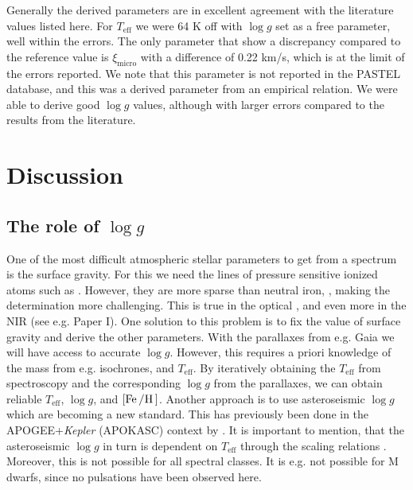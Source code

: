 \documentclass[a4paper,fleqn,usenatbib]{mnras}
\begin{document}
Generally the derived parameters are in excellent agreement with the literature
values listed here.  For $T_\mathrm{eff}$ we were 64 K off with $\log
g$ set as a free parameter, well within the errors. The only parameter that show
a discrepancy compared to the reference value is $\xi_\mathrm{micro}$ with a
difference of 0.22 km/s, which is at the limit of the errors reported. We
note that this parameter is not reported in the PASTEL database, and this was a
derived parameter from an empirical relation. We were able to derive good $\log
g$ values, although with larger errors compared to the results from the
literature.



\section{Discussion}
\label{sec:discussion}

\subsection{The role of $\log g$}

One of the most difficult atmospheric stellar parameters to get from a spectrum
is the surface gravity. For this we need the lines of pressure sensitive ionized
atoms such as . However, they are more sparse than neutral iron,
, making the determination more challenging. This is true in the
optical \citep[see e.g. the discussion by][]{Mortier2013c}, and even more in the
NIR (see e.g. Paper I). One solution to this problem is to fix the value of
surface gravity and derive the other parameters. With the parallaxes from e.g.
Gaia \citep{GAIA} we will have access to accurate $\log g$. However, this
requires a priori knowledge of the mass from e.g. isochrones, and
$T_\mathrm{eff}$. By iteratively obtaining the $T_\mathrm{eff}$ from
spectroscopy and the corresponding $\log g$ from the parallaxes, we can obtain
reliable $T_\mathrm{eff}$, $\log g$, and $[\ion{Fe}/\ion{H}]$. Another
approach is to use asteroseismic $\log g$ which are becoming a new standard.
This has previously been done in the APOGEE+\emph{Kepler} (APOKASC) context by
\citet{Pinsonneault2014,Hawkins2016}. It is important to mention, that the
asteroseismic $\log g$ in turn is dependent on $T_\mathrm{eff}$ through the
scaling relations \citep[see e.g.][]{Kjeldsen1995}. Moreover, this is not
possible for all spectral classes. It is e.g. not possible for M dwarfs, since
no pulsations have been observed here.
\end{document}
